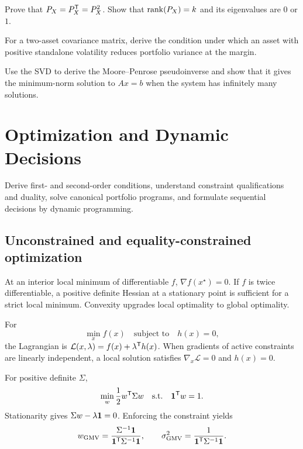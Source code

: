 \begin{exercise}
Prove that $P_X=P_X^\mathsf T=P_X^2$. Show that $\operatorname{rank}(P_X)=k$ and its eigenvalues
are $0$ or $1$.
\end{exercise}
\begin{exercise}
For a two-asset covariance matrix, derive the condition under which an asset with
positive standalone volatility reduces portfolio variance at the margin.
\end{exercise}
\begin{exercise}
Use the SVD to derive the Moore--Penrose pseudoinverse and show that it gives the
minimum-norm solution to $Ax=b$ when the system has infinitely many solutions.
\end{exercise}


\chapter{Optimization and Dynamic Decisions}

\begin{objectives}
Derive first- and second-order conditions, understand constraint qualifications and
duality, solve canonical portfolio programs, and formulate sequential decisions by
dynamic programming.
\end{objectives}

\section{Unconstrained and equality-constrained optimization}

At an interior local minimum of differentiable $f$, $\nabla f(x^\star)=0$. If $f$ is
twice differentiable, a positive definite Hessian at a stationary point is
sufficient for a strict local minimum. Convexity upgrades local optimality to global
optimality.

For
\[
\min_x f(x)\quad\text{subject to}\quad h(x)=0,
\]
the Lagrangian is $\mathcal L(x,\lambda)=f(x)+\lambda^\mathsf T h(x)$.
When gradients of active constraints are linearly independent, a local solution
satisfies $\nabla_x\mathcal L=0$ and $h(x)=0$.

\begin{example}
For positive definite $\Sigma$,
\[
\min_w\frac12w^\mathsf T\Sigma w
\quad\text{s.t.}\quad\bm 1^\mathsf T w=1.
\]
Stationarity gives $\Sigma w-\lambda\bm 1=0$. Enforcing the constraint yields
\[
w_{\mathrm{GMV}}=
\frac{\Sigma^{-1}\bm 1}{\bm 1^\mathsf T\Sigma^{-1}\bm 1},
\qquad
\sigma_{\mathrm{GMV}}^2=
\frac{1}{\bm 1^\mathsf T\Sigma^{-1}\bm 1}.
\]
\end{example}

